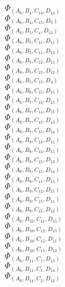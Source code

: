 \documentclass[14pt]{article}
\begin{document}
    $\Phi_{({A}_{6}, {B}_{4}, {C}_{14}, {D}_{14})}$ \\ 
    $\Phi_{({A}_{6}, {B}_{4}, {C}_{15}, {D}_{5})}$ \\ 
    $\Phi_{({A}_{6}, {B}_{5}, {C}_{4}, {D}_{15})}$ \\ 
    $\Phi_{({A}_{6}, {B}_{5}, {C}_{11}, {D}_{11})}$ \\ 
    $\Phi_{({A}_{6}, {B}_{5}, {C}_{11}, {D}_{12})}$ \\ 
    $\Phi_{({A}_{6}, {B}_{5}, {C}_{12}, {D}_{11})}$ \\ 
    $\Phi_{({A}_{6}, {B}_{5}, {C}_{12}, {D}_{12})}$ \\ 
    $\Phi_{({A}_{6}, {B}_{5}, {C}_{15}, {D}_{4})}$ \\ 
    $\Phi_{({A}_{6}, {B}_{6}, {C}_{15}, {D}_{15})}$ \\ 
    $\Phi_{({A}_{6}, {B}_{7}, {C}_{13}, {D}_{15})}$ \\ 
    $\Phi_{({A}_{6}, {B}_{7}, {C}_{14}, {D}_{15})}$ \\ 
    $\Phi_{({A}_{6}, {B}_{7}, {C}_{15}, {D}_{13})}$ \\ 
    $\Phi_{({A}_{6}, {B}_{7}, {C}_{15}, {D}_{14})}$ \\ 
    $\Phi_{({A}_{6}, {B}_{8}, {C}_{13}, {D}_{15})}$ \\ 
    $\Phi_{({A}_{6}, {B}_{8}, {C}_{14}, {D}_{15})}$ \\ 
    $\Phi_{({A}_{6}, {B}_{8}, {C}_{15}, {D}_{13})}$ \\ 
    $\Phi_{({A}_{6}, {B}_{8}, {C}_{15}, {D}_{14})}$ \\ 
    $\Phi_{({A}_{6}, {B}_{9}, {C}_{11}, {D}_{15})}$ \\ 
    $\Phi_{({A}_{6}, {B}_{9}, {C}_{12}, {D}_{15})}$ \\ 
    $\Phi_{({A}_{6}, {B}_{9}, {C}_{15}, {D}_{11})}$ \\ 
    $\Phi_{({A}_{6}, {B}_{9}, {C}_{15}, {D}_{12})}$ \\ 
    $\Phi_{({A}_{6}, {B}_{10}, {C}_{11}, {D}_{15})}$ \\ 
    $\Phi_{({A}_{6}, {B}_{10}, {C}_{12}, {D}_{15})}$ \\ 
    $\Phi_{({A}_{6}, {B}_{10}, {C}_{15}, {D}_{11})}$ \\ 
    $\Phi_{({A}_{6}, {B}_{10}, {C}_{15}, {D}_{12})}$ \\ 
    $\Phi_{({A}_{6}, {B}_{11}, {C}_{1}, {D}_{13})}$ \\ 
    $\Phi_{({A}_{6}, {B}_{11}, {C}_{1}, {D}_{14})}$ \\ 
    $\Phi_{({A}_{6}, {B}_{11}, {C}_{2}, {D}_{13})}$ \\ 
\end{document}
